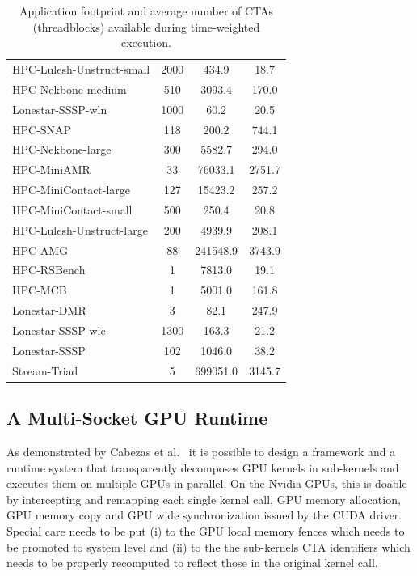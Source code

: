 \begin{table}[tp]
\begin{small}
\begin{tabular}{lccc}
HPC-Lulesh-Unstruct-small & 2000 & 434.9 & 18.7 \\
HPC-Nekbone-medium & 510 & 3093.4 & 170.0 \\
Lonestar-SSSP-wln & 1000 & 60.2 & 20.5 \\
HPC-SNAP & 118 & 200.2 & 744.1 \\
HPC-Nekbone-large & 300 & 5582.7 & 294.0 \\
HPC-MiniAMR & 33 & 76033.1 & 2751.7 \\
HPC-MiniContact-large & 127 & 15423.2 & 257.2 \\
HPC-MiniContact-small & 500 & 250.4 & 20.8 \\
HPC-Lulesh-Unstruct-large & 200 & 4939.9 & 208.1 \\
HPC-AMG & 88 & 241548.9 & 3743.9 \\
HPC-RSBench & 1 & 7813.0 & 19.1 \\
HPC-MCB & 1 & 5001.0 & 161.8 \\
Lonestar-DMR & 3 & 82.1 & 247.9 \\
Lonestar-SSSP-wlc & 1300 & 163.3 & 21.2 \\
Lonestar-SSSP & 102 & 1046.0 & 38.2 \\
Stream-Triad & 5 & 699051.0 & 3145.7 \\
\toprule
\end{tabular}
\caption{Application footprint and average number of CTAs (threadblocks) available during time-weighted execution.}
\label{tab:numctas}
\end{small}
\end{table}



\subsection{A Multi-Socket GPU Runtime}

As demonstrated by Cabezas et al.~\cite{Cabezas2015} it is possible to design 
a framework and a runtime system that transparently decomposes GPU kernels in 
sub-kernels and executes them on multiple GPUs in parallel. On the Nvidia 
GPUs, this is doable by intercepting and remapping each single kernel call, 
GPU memory allocation, GPU memory copy and GPU wide synchronization issued by 
the CUDA driver. Special care needs to be put (i) to the GPU local memory 
fences which needs to be promoted to system level and (ii) to the the 
sub-kernels CTA identifiers which needs to be properly recomputed to 
reflect those in the original kernel call. 
 
